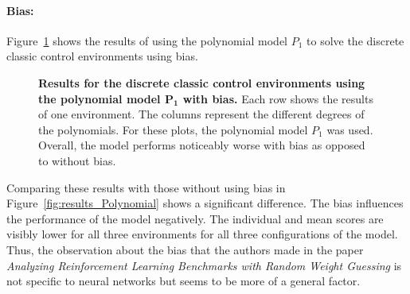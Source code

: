 \paragraph*{Bias:} Figure~\ref{fig:results_Polynomial_bias} shows the results of using the polynomial model $P_1$ to solve the discrete classic control environments using bias.
\begin{figure}[!ht]
\begin{figrow}
\item \label{row:Polynomial_CartPole_bias}  
\item \label{row:Polynomial_Acrobot_bias}  
\item \label{row:Polynomial_MountainCar_bias}  
\end{figrow}
\caption[Results for the discrete classic control environments using the polynomial model $\mathbf{P_1}$ with bias]{
  \textbf{Results for the discrete classic control environments using the polynomial model $\mathbf{P_1}$ with bias.}
   Each row shows the results of one environment. The columns represent the different degrees of the polynomials. For these plots, the polynomial model $P_1$ was used. Overall, the model performs noticeably worse with bias as opposed to without bias.
}
\label{fig:results_Polynomial_bias}
\end{figure}
Comparing these results with those without using bias in Figure~\ref{fig:results_Polynomial} shows a significant difference. The bias influences the performance of the model negatively. The individual and mean scores are visibly lower for all three environments for all three configurations of the model. Thus, the observation about the bias that the authors made in the paper \emph{Analyzing Reinforcement Learning Benchmarks with Random Weight Guessing} is not specific to neural networks but seems to be more of a general factor.

